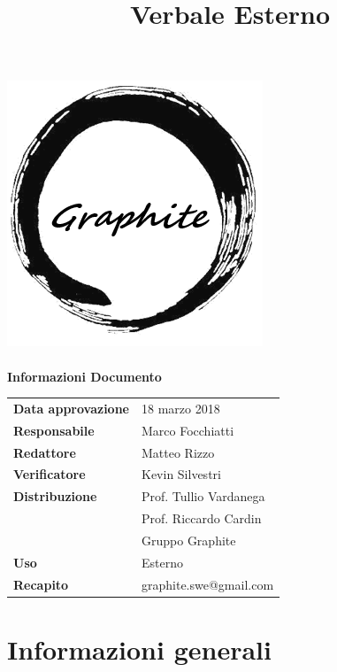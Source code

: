 \documentclass[openany,12pt,a4paper]{article}
\title{Verbale Esterno}
\author{}
\begin{document}
 
  \makeatletter 
  \begin{titlepage} 
    \setlength{\headsep}{0pt}   
    \begin{center} 
      \includegraphics[width=0.5\linewidth]{Logo.png}\\[1em] 
      {\huge \bfseries  \@title }\\[10ex] 
      \textbf{\Large Informazioni Documento} \\[2em] 
      \bgroup 
      \def\arraystretch{1.5} 
      \begin{tabular}{l|l} 
        \textbf{Data approvazione} & 18 marzo 2018 \\ 
        \textbf{Responsabile} & Marco Focchiatti \\ 
        \textbf{Redattore} & Matteo Rizzo \\ 
        \textbf{Verificatore} & Kevin Silvestri \\ 
        \textbf{Distribuzione} & Prof. Tullio Vardanega \\ 
         & Prof. Riccardo Cardin \\ 
         & Gruppo Graphite \\ 
        \textbf{Uso} & Esterno \\ 
        \textbf{Recapito} & graphite.swe@gmail.com \\ 
      \end{tabular} 
    \egroup 
    \end{center} 
  \end{titlepage} 
  \makeatother 
 
  \thispagestyle{empty} 
  \newpage 
   
  \tableofcontents 
  \newpage 
   
  \section{Informazioni generali} 
   
\end{document}
